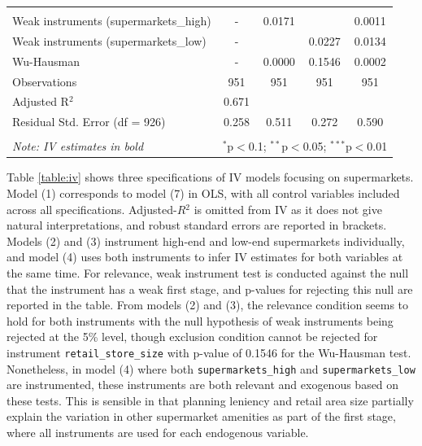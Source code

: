 \documentclass{article}
\begin{document}
\begin{table}[h]
\begin{tabular}{@{\extracolsep{5pt}}lcccc}
\hline \\[-1.8ex] 
Weak instruments (supermarkets\_high) & - & 0.0171 &  & 0.0011  \\ 
Weak instruments (supermarkets\_low) & - &  & 0.0227 & 0.0134 \\ 
Wu-Hausman & - & 0.0000 & 0.1546 & 0.0002\\ 
Observations & 951 & 951 & 951 & 951 \\ 
Adjusted R$^{2}$ & 0.671 &  &  &  \\ 
Residual Std. Error (df = 926) & 0.258 & 0.511 & 0.272 & 0.590 \\ 
\hline 
\hline \\[-1.8ex] 
\textit{Note: IV estimates in bold}  & \multicolumn{4}{r}{$^{*}$p$<$0.1; $^{**}$p$<$0.05; $^{***}$p$<$0.01} \\ 
\end{tabular} 
\end{table}

Table \ref{table:iv} shows three specifications of IV models focusing on supermarkets. Model (1) corresponds to model (7) in OLS, with all control variables included across all specifications. Adjusted-$R{^2}$ is omitted from IV as it does not give natural interpretations, and robust standard errors are reported in brackets. Models (2) and (3) instrument high-end and low-end supermarkets individually, and model (4) uses both instruments to infer IV estimates for both variables at the same time. For relevance, weak instrument test is conducted against the null that the instrument has a weak first stage, and p-values for rejecting this null are reported in the table. From models (2) and (3), the relevance condition seems to hold for both instruments with the null hypothesis of weak instruments being rejected at the 5\% level, though exclusion condition cannot be rejected for instrument \texttt{retail\_store\_size} with p-value of 0.1546 for the  Wu-Hausman test. Nonetheless, in model (4) where both \texttt{supermarkets\_high} and \texttt{supermarkets\_low} are instrumented, these instruments are both relevant and exogenous based on these tests. This is sensible in that planning leniency and retail area size partially explain the variation in other supermarket amenities as part of the first stage, where all instruments are used for each endogenous variable.
\end{document}
